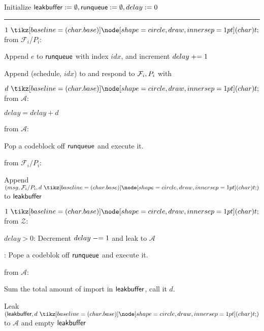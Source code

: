 \begin{bbox}[title={\textbf{Wrapper} $\mathcal{W}_{\msf{async}}$} ]

Initialize ${\mathsf {leakbuffer}} := \emptyset, {\mathsf {runqueue}} := \emptyset, delay := 0$

\vspace{2mm} \hrule \vspace{2mm}

\OnInput {} $1 \token$ from $\mathcal{F}_i$/$P_i$:
	\begin{ritemize}

		\item Append $e$ to ${\mathsf {runqueue}}$ with index $idx$, and increment $delay \mathrel{+}= 1$
		\item Append (schedule, $idx$) to  and respond to $\mathcal{F}_i,P_i$ with 

	\end{ritemize}

\OnInput {} $d \token$ from $\mathcal{A}$:
	\begin{ritemize}
		\item $delay = delay + d$
	\end{ritemize}

\OnInput {} from $\mathcal{A}$:
	\begin{ritemize}	
		\item Pop a codeblock off ${\mathsf {runqueue}}$  and execute it.
	\end{ritemize} 

\OnInput {} from $\mathcal{F}_i/P_i$:
	\begin{ritemize}
		\item Append $(msg, \mathcal{F}_i/P_i, d \token)$ to ${\mathsf {leakbuffer}}$
	\end{ritemize}

\OnInput {} $1 \token$ from $\mathcal{Z}$:
	\begin{ritemize}
		\item \If $delay > 0$:
			Decrement $delay \mathrel{-}= 1$ and leak  to $\mathcal{A}$
		\item \Else: 
			Pope a codeblok off ${\mathsf {runqueue}}$ and execute it.
	\end{ritemize}

\OnInput {} from $\mathcal{A}$:
	\begin{ritemize}
		\item Sum the total amount of import in ${\mathsf {leakbuffer}}$, call it $d$.
		\item Leak $(\msf{leakbuffer},d \token)$ to $\mathcal{A}$ and empty ${\mathsf {leakbuffer}}$
	\end{ritemize}
\end{bbox}
